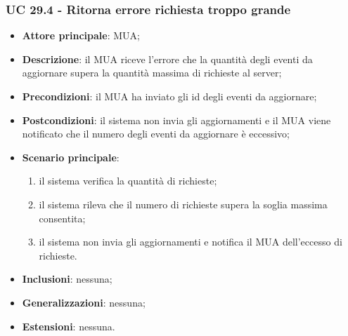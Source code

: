     \subsubsection{UC 29.4 - Ritorna errore richiesta troppo grande} \label{sec:UC29.4}
    \begin{itemize}
        \item \textbf{Attore principale}: MUA;
        \item \textbf{Descrizione}: il MUA riceve l'errore che la quantità degli eventi da aggiornare supera la quantità massima di richieste al server;
        \item \textbf{Precondizioni}: il MUA ha inviato gli id degli eventi da aggiornare;
        \item \textbf{Postcondizioni}: il sistema non invia gli aggiornamenti e il MUA viene notificato che il numero degli eventi da aggiornare è eccessivo;
        \item \textbf{Scenario principale}:
            \begin{enumerate}
                \item il sistema verifica la quantità di richieste;
                \item il sistema rileva che il numero di richieste supera la soglia massima consentita;
                \item il sistema non invia gli aggiornamenti e notifica il MUA dell'eccesso di richieste.
            \end{enumerate}
        \item \textbf{Inclusioni}: nessuna;
        \item \textbf{Generalizzazioni}: nessuna;
        \item \textbf{Estensioni}: nessuna.
    \end{itemize}


